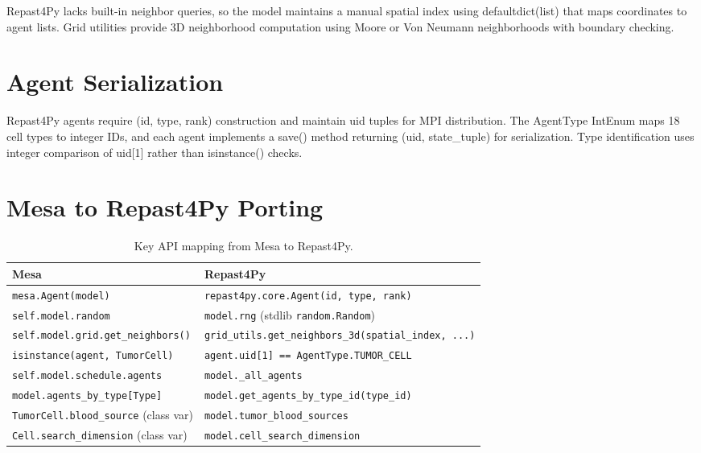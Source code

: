 Repast4Py lacks built-in neighbor queries, so the model maintains a manual spatial index using defaultdict(list) that maps coordinates to agent lists. Grid utilities provide 3D neighborhood computation using Moore or Von Neumann neighborhoods with boundary checking.

\section{Agent Serialization}
\label{sec:agent-serialization}

Repast4Py agents require (id, type, rank) construction and maintain uid tuples for MPI distribution. The AgentType IntEnum maps 18 cell types to integer IDs, and each agent implements a save() method returning (uid, state_tuple) for serialization. Type identification uses integer comparison of uid[1] rather than isinstance() checks.

\section{Mesa to Repast4Py Porting}
\label{sec:porting}

\begin{table}[H]
\centering
\caption{Key API mapping from Mesa to Repast4Py.}
\label{tab:porting-mapping}
\begin{tabular}{@{}p{6cm}p{7.5cm}@{}}
\toprule
\textbf{Mesa} & \textbf{Repast4Py} \\
\midrule
\texttt{mesa.Agent(model)} & \texttt{repast4py.core.Agent(id, type, rank)} \\
\texttt{self.model.random} & \texttt{model.rng} (stdlib \texttt{random.Random}) \\
\texttt{self.model.grid.get\_neighbors()} & \texttt{grid\_utils.get\_neighbors\_3d(spatial\_index, ...)} \\
\texttt{isinstance(agent, TumorCell)} & \texttt{agent.uid[1] == AgentType.TUMOR\_CELL} \\
\texttt{self.model.schedule.agents} & \texttt{model.\_all\_agents} \\
\texttt{model.agents\_by\_type[Type]} & \texttt{model.get\_agents\_by\_type\_id(type\_id)} \\
\texttt{TumorCell.blood\_source} (class var) & \texttt{model.tumor\_blood\_sources} \\
\texttt{Cell.search\_dimension} (class var) & \texttt{model.cell\_search\_dimension} \\
\bottomrule
\end{tabular}
\end{table}

